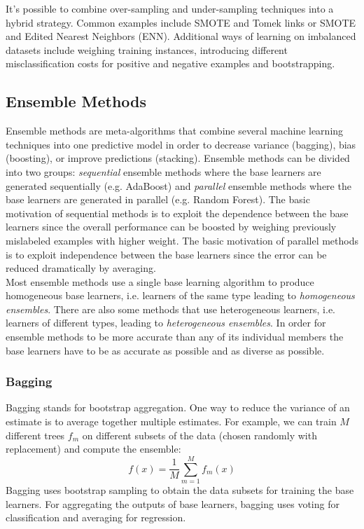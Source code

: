 It's possible to combine over-sampling and under-sampling techniques into a hybrid strategy. Common examples include SMOTE and Tomek links or SMOTE and Edited Nearest Neighbors (ENN). Additional ways of learning on imbalanced datasets include weighing training instances, introducing different misclassification costs for positive and negative examples and bootstrapping. 


\subsection{Ensemble Methods}

Ensemble methods are meta-algorithms that combine several machine learning techniques into one predictive model in order to decrease variance (bagging), bias (boosting), or improve predictions (stacking). Ensemble methods can be divided into two groups: \textit{sequential} ensemble methods where the base learners are generated sequentially (e.g. AdaBoost) and \textit{parallel} ensemble methods where the base learners are generated in parallel (e.g. Random Forest). The basic motivation of sequential methods is to exploit the dependence between the base learners since the overall performance can be boosted by weighing previously mislabeled examples with higher weight.  The basic motivation of parallel methods is to exploit independence between the base learners since the error can be reduced dramatically by averaging.\\  

Most ensemble methods use a single base learning algorithm to produce homogeneous base learners, i.e. learners of the same type leading to \textit{homogeneous ensembles}. There are also some methods that use heterogeneous learners, i.e. learners of different types, leading to \textit{heterogeneous ensembles}. In order for ensemble methods to be more accurate than any of its individual members the base learners have to be as accurate as possible and as diverse as possible. \\

\subsubsection{Bagging}

Bagging stands for bootstrap aggregation. One way to reduce the variance of an estimate is to average together multiple estimates. For example, we can train $M$ different trees $f_m$ on different subsets of the data (chosen randomly with replacement) and compute the ensemble:
\begin{equation}
   f(x) = \frac{1}{M}\sum_{m=1}^{M}f_m(x)
\end{equation}
Bagging uses bootstrap sampling to obtain the data subsets for training the base learners. For aggregating the outputs of base learners, bagging uses voting for classification and averaging for regression.

